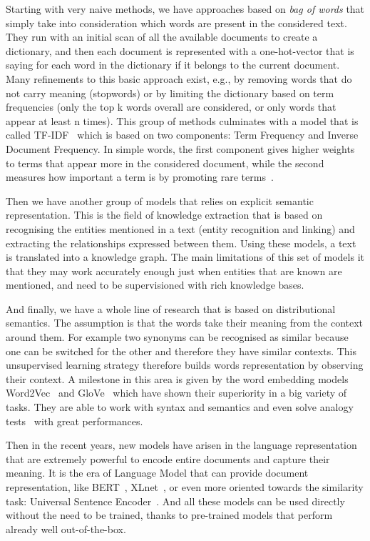 Starting with very naive methods, we have approaches based on \emph{bag of words} that simply take into consideration which words are present in the considered text.
They run with an initial scan of all the available documents to create a dictionary, and then each document is represented with a one-hot-vector that is saying for each word in the dictionary if it belongs to the current document.
Many refinements to this basic approach exist, e.g., by removing words that do not carry meaning (stopwords) or by limiting the dictionary based on term frequencies (only the top k words overall are considered, or only words that appear at least n times).
This group of methods culminates with a model that is called TF-IDF~\cite{ramos2003using} which is based on two components: Term Frequency and Inverse Document Frequency.
In simple words, the first component gives higher weights to terms that appear more in the considered document, while the second measures how important a term is by promoting rare terms~\cite{jones1972statistical}.

Then we have another group of models that relies on explicit semantic representation. This is the field of knowledge extraction that is based on recognising the entities mentioned in a text (entity recognition and linking) and extracting the relationships expressed between them. Using these models, a text is translated into a knowledge graph.
The main limitations of this set of models it that they may work accurately enough just when entities that are known are mentioned, and need to be supervisioned with rich knowledge bases.

And finally, we have a whole line of research that is based on distributional semantics.
The assumption is that the words take their meaning from the context around them. For example two synonyms can be recognised as similar because one can be switched for the other and therefore they have similar contexts.
This unsupervised learning strategy therefore builds words representation by observing their context.
A milestone in this area is given by the word embedding models Word2Vec~\cite{mikolov2013efficient} and GloVe~\cite{pennington2014glove} which have shown their superiority in a big variety of tasks.
They are able to work with syntax and semantics and even solve analogy tests~\cite{mikolov2013efficient} with great performances.

Then in the recent years, new models have arisen in the language representation that are extremely powerful to encode entire documents and capture their meaning. It is the
era of
Language Model that can provide document representation, like BERT~\cite{devlin2018bert}, XLnet~\cite{yang2019xlnet}, or even more oriented towards the similarity task: Universal Sentence Encoder~\cite{cer2018universal}.
And all these models can be used directly without the need to be trained, thanks to pre-trained models that perform already well out-of-the-box.

